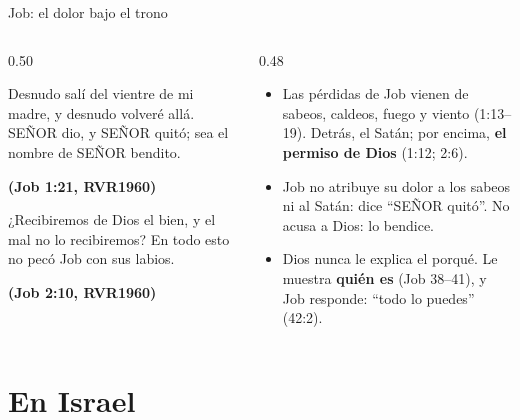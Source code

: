 \documentclass[hyperref={bookmarks=false},aspectratio=169]{beamer}
\newcommand{\SENOR}{S{\fontsize{0.78em}{1em}\selectfont EÑOR}}
\newcommand{\fuente}[1]{\par\hfill{\upshape\bfseries\footnotesize\textcolor{azul}{#1}}}
\newcommand{\destacar}[1]{\textbf{\textcolor{azul}{#1}}}
\begin{document}
\begin{frame}{Job: el dolor bajo el trono}
\begin{columns}[t,onlytextwidth]
\begin{column}{0.50\textwidth}
\begin{cita}Desnudo salí del vientre de mi madre, y desnudo volveré allá. \SENOR{} dio, y \SENOR{} quitó; sea el nombre de \SENOR{} bendito.\fuente{(Job 1:21, RVR1960)}\end{cita}
\begin{cita}¿Recibiremos de Dios el bien, y el mal no lo recibiremos? En todo esto no pecó Job con sus labios.\fuente{(Job 2:10, RVR1960)}\end{cita}
\end{column}
\begin{column}{0.48\textwidth}\small
\begin{itemize}
\item Las pérdidas de Job vienen de sabeos, caldeos, fuego y viento (1:13--19). Detrás, el Satán; por encima, \destacar{el permiso de Dios} (1:12; 2:6).
\item Job no atribuye su dolor a los sabeos ni al Satán: dice ``\SENOR{} quitó''. No acusa a Dios: lo bendice.
\item Dios nunca le explica el porqué. Le muestra \destacar{quién es} (Job 38--41), y Job responde: ``todo lo puedes'' (42:2).
\end{itemize}
\end{column}
\end{columns}
\end{frame}

\section{En Israel}
\end{document}
